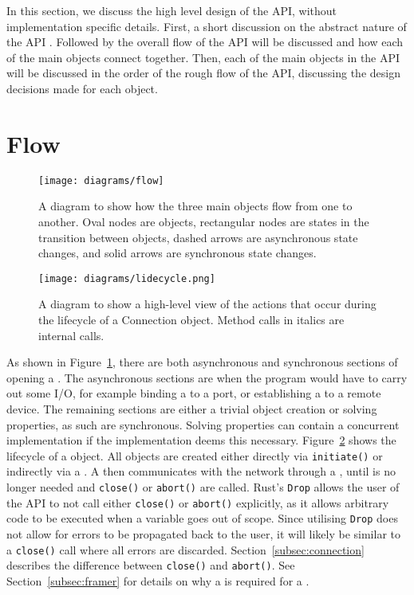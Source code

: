 In this section, we discuss the high level design of the API, without implementation specific details.
First, a short discussion on the abstract nature of the API .
Followed by the overall flow of the API will be discussed and how each of the main objects connect together.
Then, each of the main objects in the API will be discussed in the order of the rough flow of the API, discussing
the design decisions made for each object.

\section{Flow}\label{sec:flow}
\begin{figure}[h]
    \centering
    \texttt{[image: diagrams/flow]}
    \caption{A diagram to show how the three main objects flow from one to another.
    Oval nodes are objects, rectangular nodes are states in the transition between objects, dashed arrows are
    asynchronous state changes, and solid arrows are synchronous state changes.}
    \label{fig:flow}
\end{figure}

\begin{figure}[h]
    \centering
    \texttt{[image: diagrams/lidecycle.png]}
    \caption{A diagram to show a high-level view of the actions that occur during the lifecycle of a Connection object.
    Method calls in italics are internal calls.}
    \label{fig:lifecycle}
\end{figure}

As shown in Figure~\ref{fig:flow}, there are both asynchronous and synchronous sections of opening a \connection{}.
The asynchronous sections are when the program would have to carry out some I/O, for example binding a \listener{}
to a port, or establishing a \connection{} to a remote device.
The remaining sections are either a trivial object creation or solving properties, as such are synchronous.
Solving properties can contain a concurrent implementation if the implementation deems this necessary.
Figure~\ref{fig:lifecycle} shows the lifecycle of a \connection{} object.
All \connection{} objects are created either directly via \texttt{initiate()} or indirectly via a \listener{}.
A \connection{} then communicates with the network through a \framer{}, until \connection{} is no longer
needed and \texttt{close()} or \texttt{abort()} are called.
Rust's \texttt{Drop} allows the user of the API to not call either \texttt{close()} or \texttt{abort()} explicitly, as
it allows arbitrary code to be executed when a variable goes out of scope.
Since utilising \texttt{Drop} does not allow for errors to be propagated back to the user, it will likely be similar to
a \texttt{close()} call where all errors are discarded.
Section~\ref{subsec:connection} describes the difference between \texttt{close()} and \texttt{abort()}.
See Section~\ref{subsec:framer} for details on why a \framer{} is required for a \connection{}.

